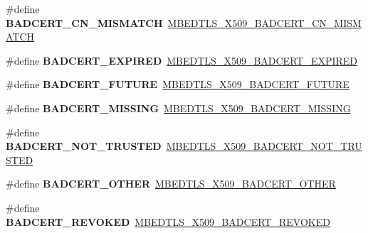 \begin{DoxyCompactItemize}
\mbox{\label{compat-1_83_8h_acfafc04b8cd60bd1819cf41bc78a24de}} 
\#define {\bfseries B\+A\+D\+C\+E\+R\+T\+\_\+\+C\+N\+\_\+\+M\+I\+S\+M\+A\+T\+CH}~\mbox{\hyperlink{group__x509__module_ga6e71468985ebf243ca7cfce5c3dea881}{M\+B\+E\+D\+T\+L\+S\+\_\+\+X509\+\_\+\+B\+A\+D\+C\+E\+R\+T\+\_\+\+C\+N\+\_\+\+M\+I\+S\+M\+A\+T\+CH}}
\item 
\mbox{\label{compat-1_83_8h_a64e936014215ef18f026ff101b6f8369}} 
\#define {\bfseries B\+A\+D\+C\+E\+R\+T\+\_\+\+E\+X\+P\+I\+R\+ED}~\mbox{\hyperlink{group__x509__module_ga5f03158dcacc5914872e38c68231b642}{M\+B\+E\+D\+T\+L\+S\+\_\+\+X509\+\_\+\+B\+A\+D\+C\+E\+R\+T\+\_\+\+E\+X\+P\+I\+R\+ED}}
\item 
\mbox{\label{compat-1_83_8h_a277aa22d31ad26e5256ec96e589bd5b9}} 
\#define {\bfseries B\+A\+D\+C\+E\+R\+T\+\_\+\+F\+U\+T\+U\+RE}~\mbox{\hyperlink{group__x509__module_gac769acbb18e53198ae2d2e63bd339cfa}{M\+B\+E\+D\+T\+L\+S\+\_\+\+X509\+\_\+\+B\+A\+D\+C\+E\+R\+T\+\_\+\+F\+U\+T\+U\+RE}}
\item 
\mbox{\label{compat-1_83_8h_a99f857088210c1d15a11039026830a0d}} 
\#define {\bfseries B\+A\+D\+C\+E\+R\+T\+\_\+\+M\+I\+S\+S\+I\+NG}~\mbox{\hyperlink{group__x509__module_ga8bca03e3c2c89460bea17ab142b0b7ab}{M\+B\+E\+D\+T\+L\+S\+\_\+\+X509\+\_\+\+B\+A\+D\+C\+E\+R\+T\+\_\+\+M\+I\+S\+S\+I\+NG}}
\item 
\mbox{\label{compat-1_83_8h_a71c9686585580f77964a3653e147ad0a}} 
\#define {\bfseries B\+A\+D\+C\+E\+R\+T\+\_\+\+N\+O\+T\+\_\+\+T\+R\+U\+S\+T\+ED}~\mbox{\hyperlink{group__x509__module_ga0e5b1d4c9c1a1a3227238c82042c1d1b}{M\+B\+E\+D\+T\+L\+S\+\_\+\+X509\+\_\+\+B\+A\+D\+C\+E\+R\+T\+\_\+\+N\+O\+T\+\_\+\+T\+R\+U\+S\+T\+ED}}
\item 
\mbox{\label{compat-1_83_8h_abeaea946ef3512d85af10fd3f16b2b5f}} 
\#define {\bfseries B\+A\+D\+C\+E\+R\+T\+\_\+\+O\+T\+H\+ER}~\mbox{\hyperlink{group__x509__module_ga76bdd50937a671ef62474b7e38e23e02}{M\+B\+E\+D\+T\+L\+S\+\_\+\+X509\+\_\+\+B\+A\+D\+C\+E\+R\+T\+\_\+\+O\+T\+H\+ER}}
\item 
\mbox{\label{compat-1_83_8h_a4ecb1ad0da0f9d6bb0017e091ea4ee2a}} 
\#define {\bfseries B\+A\+D\+C\+E\+R\+T\+\_\+\+R\+E\+V\+O\+K\+ED}~\mbox{\hyperlink{group__x509__module_gaddd96a9eb80fab17bce02d2a147ea504}{M\+B\+E\+D\+T\+L\+S\+\_\+\+X509\+\_\+\+B\+A\+D\+C\+E\+R\+T\+\_\+\+R\+E\+V\+O\+K\+ED}}

\end{DoxyCompactItemize}
